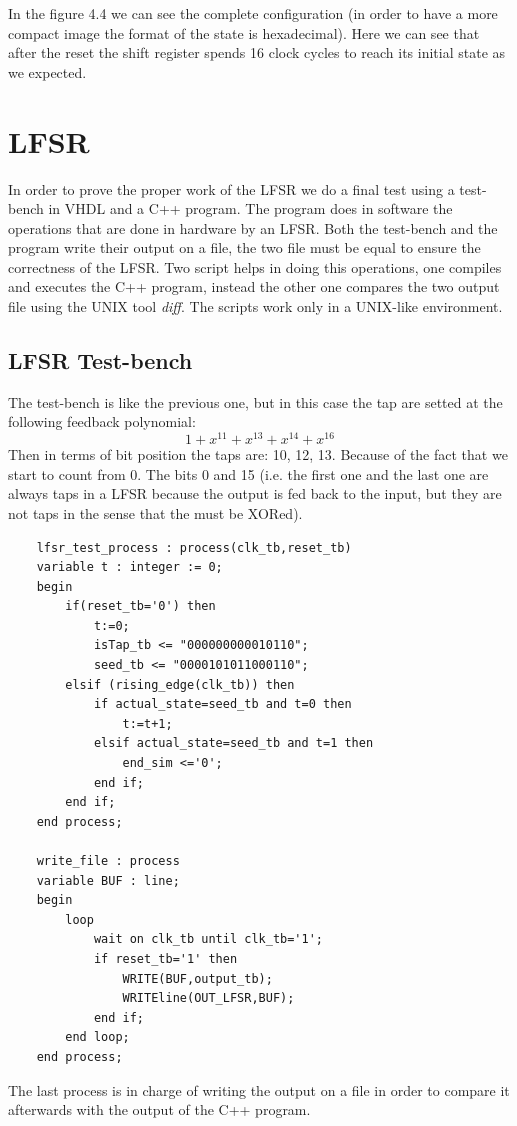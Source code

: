 \documentclass[a4paper]{report}
\begin{document}
\noindent In the figure 4.4 we can see the complete configuration (in order to have a more compact image the format of the state is hexadecimal). Here we can see that after the reset the shift register spends 16 clock cycles to reach its initial state as we expected.

\section{LFSR}
In order to prove the proper work of the LFSR we do a final test using a test-bench in VHDL and a C++ program. The program does in software the operations that are done in hardware by an LFSR. Both the test-bench and the program write their output on a file, the two file must be equal to ensure the correctness of the LFSR. Two script helps in doing this operations, one compiles and executes the C++ program, instead the other one compares the two output file using the UNIX tool \emph{diff}. The scripts work only in a UNIX-like environment.
\subsection{LFSR Test-bench}
\noindent The test-bench is like the previous one, but in this case the tap are setted at the following feedback polynomial: 
\[1+x^{11}+x^{13}+x^{14}+x^{16}\]
Then in terms of bit position the taps are: 10, 12, 13. Because of the fact that we start to count from 0. The bits 0 and 15 (i.e. the first one and the last one are always taps in a LFSR because the output is fed back to the input, but they are not taps in the sense that the must be XORed).
\begin{lstlisting}
	lfsr_test_process : process(clk_tb,reset_tb)
	variable t : integer := 0;
	begin
		if(reset_tb='0') then
			t:=0;
			isTap_tb <= "000000000010110";
			seed_tb <= "0000101011000110";
		elsif (rising_edge(clk_tb)) then
			if actual_state=seed_tb and t=0 then
				t:=t+1;
			elsif actual_state=seed_tb and t=1 then
				end_sim <='0';
			end if;
		end if;
	end process;
	
	write_file : process
	variable BUF : line;
	begin
		loop
			wait on clk_tb until clk_tb='1';
			if reset_tb='1' then
				WRITE(BUF,output_tb);
				WRITEline(OUT_LFSR,BUF);
			end if;
		end loop;
	end process;
\end{lstlisting}

\noindent The last process is in charge of writing the output on a file in order to compare it afterwards with the output of the C++ program.
\end{document}
